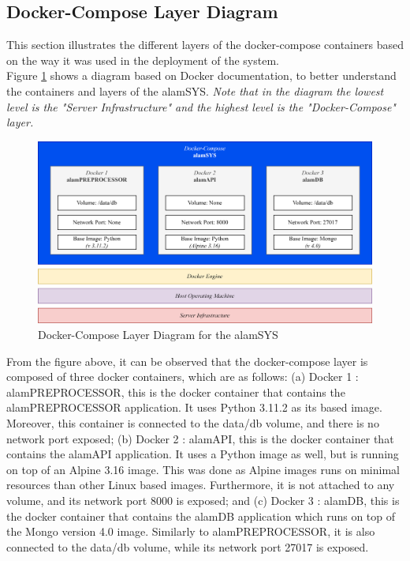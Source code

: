 \subsection{Docker-Compose Layer Diagram}
\label{subsec:docker_compose_diagram}
This section illustrates the different layers of the docker-compose 
containers based on the way it was used in the 
deployment of the system.
\hfill \\

Figure \ref{fig:docker_compose_layout} shows a diagram based
on Docker documentation, to better understand the containers and layers
of the alamSYS. \textit{Note that in the diagram the lowest level is the "Server Infrastructure"
and the highest level is the "Docker-Compose" layer.}

\begin{figure}[ht]
    \centering
    \includegraphics[width=1\textwidth]{./assets/Chapter_3/Docker-Compose Layout.png}
    \caption{Docker-Compose Layer Diagram for the alamSYS}
    \label{fig:docker_compose_layout}
\end{figure}
\FloatBarrier

From the figure above, it can be observed that the docker-compose layer is composed
of three docker containers, which are as follows:
(a) Docker 1 : alamPREPROCESSOR, this is the docker container that contains
the alamPREPROCESSOR application. It uses Python 3.11.2 as its based image. Moreover,
this container is connected to the data/db volume, and there is no network port exposed;
(b) Docker 2 : alamAPI, this is the docker container that contains the alamAPI
application. It uses a Python image as well, but is running on top of an Alpine 3.16 image.
This was done as Alpine images runs on minimal resources than other Linux based images.
Furthermore, it is not attached to any volume, and its network port
8000 is exposed; and
(c) Docker 3 : alamDB, this is the docker container that contains the alamDB application
which runs on top of the Mongo version 4.0 image. Similarly to alamPREPROCESSOR, it is also 
connected to the data/db volume, while its network port 27017 is exposed.